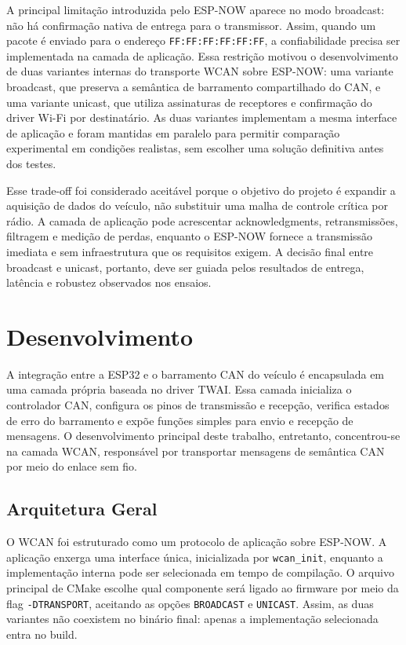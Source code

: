 \documentclass{article}
\begin{document}
    A principal limitação introduzida pelo ESP-NOW aparece no modo broadcast: não há confirmação nativa de entrega para o transmissor. Assim, quando um pacote é enviado para o endereço \texttt{FF:FF:FF:FF:FF:FF}, a confiabilidade precisa ser implementada na camada de aplicação. Essa restrição motivou o desenvolvimento de duas variantes internas do transporte WCAN sobre ESP-NOW: uma variante broadcast, que preserva a semântica de barramento compartilhado do CAN, e uma variante unicast, que utiliza assinaturas de receptores e confirmação do driver Wi-Fi por destinatário. As duas variantes implementam a mesma interface de aplicação e foram mantidas em paralelo para permitir comparação experimental em condições realistas, sem escolher uma solução definitiva antes dos testes.

    Esse trade-off foi considerado aceitável porque o objetivo do projeto é expandir a aquisição de dados do veículo, não substituir uma malha de controle crítica por rádio. A camada de aplicação pode acrescentar acknowledgments, retransmissões, filtragem e medição de perdas, enquanto o ESP-NOW fornece a transmissão imediata e sem infraestrutura que os requisitos exigem. A decisão final entre broadcast e unicast, portanto, deve ser guiada pelos resultados de entrega, latência e robustez observados nos ensaios.


    \section{Desenvolvimento}

    A integração entre a ESP32 e o barramento CAN do veículo é encapsulada em uma camada própria baseada no driver TWAI. Essa camada inicializa o controlador CAN, configura os pinos de transmissão e recepção, verifica estados de erro do barramento e expõe funções simples para envio e recepção de mensagens. O desenvolvimento principal deste trabalho, entretanto, concentrou-se na camada WCAN, responsável por transportar mensagens de semântica CAN por meio do enlace sem fio.

    \subsection{Arquitetura Geral}

    O WCAN foi estruturado como um protocolo de aplicação sobre ESP-NOW. A aplicação enxerga uma interface única, inicializada por \texttt{wcan_init}, enquanto a implementação interna pode ser selecionada em tempo de compilação. O arquivo principal de CMake escolhe qual componente será ligado ao firmware por meio da flag \texttt{-DTRANSPORT}, aceitando as opções \texttt{BROADCAST} e \texttt{UNICAST}. Assim, as duas variantes não coexistem no binário final: apenas a implementação selecionada entra no build.
\end{document}
